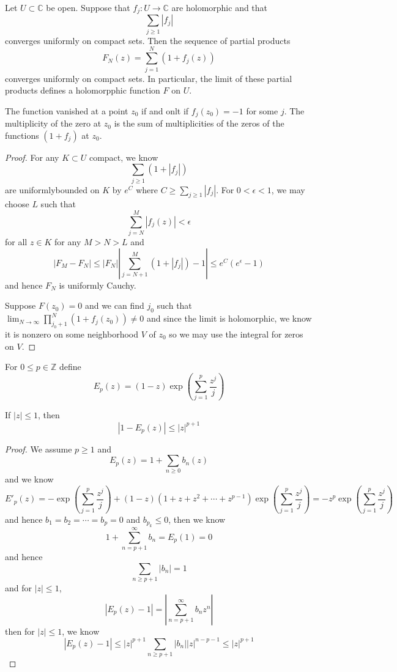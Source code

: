 \documentclass[lang=en, color=blue, ]{elegantbook}
\newcommand{\Z}{\mathbb{Z}}
\newcommand{\C}{\mathbb{C}}
\begin{document}
\begin{theorem}
    Let $U\subset \C$ be open. Suppose that $f_j : U\to\C$ are holomorphic and that
    \[\sum\limits_{j\geq 1}|f_j|\]
    converges uniformly on compact sets. Then the sequence of partial products
    \[F_N(z) = \sum\limits_{j=1}^N(1+f_j(z))\]
    converges uniformly on compact sets. In particular, the limit of these partial products defines a holomorpphic function $F$ on $U$.\par
    The function vanished at a point $z_0$ if and onlt if $f_j(z_0) = -1$ for some $j$. The multiplicity of the zero at $z_0$ is the sum of multiplicities of the zeros of the functions $(1+f_j)$ at $z_0$.
\end{theorem}
\begin{proof}
    For any $K\subset U$ compact, we know
    \[\sum\limits_{j\geq 1}(1+|f_j|)\]
    are uniformlybounded on $K$ by $e^C$ where $C \geq \sum\limits_{j\geq 1}|f_j|$. For $0<\epsilon < 1$, we may choose $L$ such that
    \[
    \sum\limits_{j=N}^M |f_j(z)| < \epsilon
    \]
    for all $z\in K$ for any $M>N>L$ and 
    \[
    |F_M-F_N| \leq |F_N||\sum\limits_{j=N+1}^{M}(1+|f_j|)-1| \leq e^C(e^{\epsilon} - 1)
    \]
    and hence $F_N$ is uniformly Cauchy.\par
    Suppose $F(z_0) = 0$ and we can find $j_0$ such that $\lim_{N\to\infty} \prod_{j_0+1}^N(1+f_j(z_0)) \neq 0$ and since the limit is holomorphic, we know it is nonzero on some neighborhood $V$ of $z_0$ so we may use the integral for zeros on $V$.
\end{proof}

\begin{definition}
    For $0\leq p \in \Z$ define
    \[E_p(z)  = (1-z)\exp(\sum\limits_{j=1}^p \dfrac{z^j}{j})\]
\end{definition}
\begin{lemma}
    If $|z|\leq 1$, then
    \[|1-E_p(z)| \leq |z|^{p+1}\]
\end{lemma}
\begin{proof}
    We assume $p\geq 1$ and 
    \[
    E_p(z) = 1 + \sum\limits_{n\geq 0} b_n(z)
    \]
    and we know
    \[
    E'_p(z) = -\exp(\sum\limits_{j=1}^p \dfrac{z^j}{j}) + (1-z)(1+z+z^2+\cdots+z^{p-1})\exp(\sum\limits_{j=1}^p \dfrac{z^j}{j}) = -z^p\exp(\sum\limits_{j=1}^p \dfrac{z^j}{j})
    \]
    and hence $b_1 = b_2 = \cdots = b_p = 0$ and $b_{p_k} \leq 0$, then we know
    \[
    1 + \sum\limits_{n = p+1}^{\infty} b_n= E_p(1) = 0
    \]
    and hence
    \[
    \sum\limits_{n\geq p+1} |b_n| = 1 
    \]
    and for $|z|\leq 1$,
    \[
    |E_p(z) - 1| = |\sum\limits_{n=p+1}^{\infty} b_n z^n|
    \]
    then for $|z|\leq 1$, we know
    \[
    |E_p(z) - 1| \leq |z|^{p+1}\sum\limits_{n\geq p+1}|b_n||z|^{n-p-1} \leq |z|^{p+1}
    \]
\end{proof}
\end{document}
